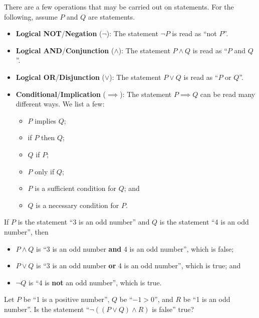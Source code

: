 There are a few operations that may be carried out on statements. For the following, assume $P$ and $Q$ are statements.
\begin{itemize}
    \item \textbf{Logical NOT}/\textbf{Negation} ($\lnot$): The statement $\lnot P$ is read as ``not $P$''.
    \item \textbf{Logical AND}/\textbf{Conjunction} ($\land$): The statement $P\land Q$ is read as ``$P$ and $Q$''.
    \item \textbf{Logical OR}/\textbf{Disjunction} ($\lor$): The statement $P\lor Q$ is read as ``$P$ or $Q$''.
    
    \newpage

    \item \textbf{Conditional}/\textbf{Implication} ($\implies$): The statement $P \implies Q$ can be read many different ways. We list a few:
    \begin{itemize}
        \item $P$ implies $Q$;
        \item if $P$ then $Q$;
        \item $Q$ if $P$;
        \item $P$ only if $Q$;
        \item $P$ is a sufficient condition for $Q$; and
        \item $Q$ is a necessary condition for $P$.
    \end{itemize}
\end{itemize}
\begin{example}
    If $P$ is the statement ``3 is an odd number'' and $Q$ is the statement ``4 is an odd number'', then
    \begin{itemize}
        \item $P\land Q$ is ``3 is an odd number \textbf{and} 4 is an odd number'', which is false;
        \item $P\lor Q$ is ``3 is an odd number \textbf{or} 4 is an odd number'', which is true; and
        \item $\lnot Q$ is ``4 is \textbf{not} an odd number'', which is true.
    \end{itemize}
\end{example}
\begin{exercise}
    Let $P$ be ``1 is a positive number'', $Q$ be ``$-1 > 0$'', and $R$ be ``1 is an odd number''. Is the statement ``$\lnot((P\lor Q)\land R)$ is false'' true?
\end{exercise}

